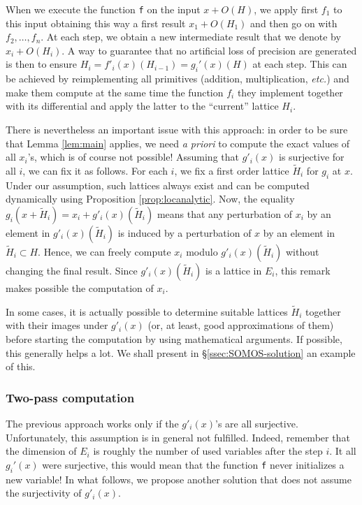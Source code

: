 \documentclass{lms}
\begin{document}
When we execute the function {\tt f} on the input $x + O(H)$, we apply 
first $f_1$ to this input obtaining this way a first result $x_1 + 
O(H_1)$ and then go on with $f_2, \ldots, f_n$. At each step, we obtain 
a new intermediate result that we denote by $x_i + O(H_i)$. A way to 
guarantee that no artificial loss of precision are generated is then to 
ensure $H_i = f'_i(x)(H_{i-1}) = g_i'(x)(H)$ at each step. This can be 
achieved by reimplementing all primitives (addition, multiplication, 
\emph{etc.}) and make them compute at the same time the function $f_i$
they implement together with its differential and apply the latter to
the ``current'' lattice $H_i$.

There is nevertheless an important issue with this approach: in order to 
be sure that Lemma \ref{lem:main} applies, we need \emph{a priori} to 
compute the exact values of all $x_i$'s, which is of course not 
possible! Assuming that $g'_i(x)$ is surjective for all $i$, we can fix 
it as follows. For each $i$, we fix a first order lattice $\tilde H_i$ 
for $g_i$ at $x$. Under our assumption, such lattices always exist and 
can be computed dynamically using Proposition \ref{prop:locanalytic}. 
Now, the equality $g_i(x + \tilde H_i) = x_i + g'_i(x)(\tilde H_i)$ 
means that any perturbation of $x_i$ by an element in $g'_i(x) (\tilde 
H_i)$ is induced by a perturbation of $x$ by an element in $\tilde H_i 
\subset H$. Hence, we can freely compute $x_i$ modulo $g'_i(x) (\tilde 
H_i)$ without changing the final result. Since $g'_i(x)(\tilde H_i)$ is 
a lattice in $E_i$, this remark makes possible the computation of $x_i$.

\begin{rmk}
In some cases, it is actually possible to determine suitable lattices 
$\tilde H_i$ together with their images under $g'_i(x)$ (or, at
least, good approximations of them) before starting the computation 
by using mathematical arguments. If possible, this generally helps a
lot. We shall present in \S \ref{ssec:SOMOS-solution} an example of 
this.
\end{rmk}

\subsubsection*{Two-pass computation}

The previous approach works only if the $g'_i(x)$'s are all surjective. 
Unfortunately, this assumption is in general not fulfilled. Indeed, 
remember that the dimension of $E_i$ is roughly the number of used 
variables after the step $i$. It all $g_i'(x)$ were surjective, this 
would mean that the function {\tt f} never initializes a new variable!
In what follows, we propose another solution that does not assume the
surjectivity of $g'_i(x)$.
\end{document}
